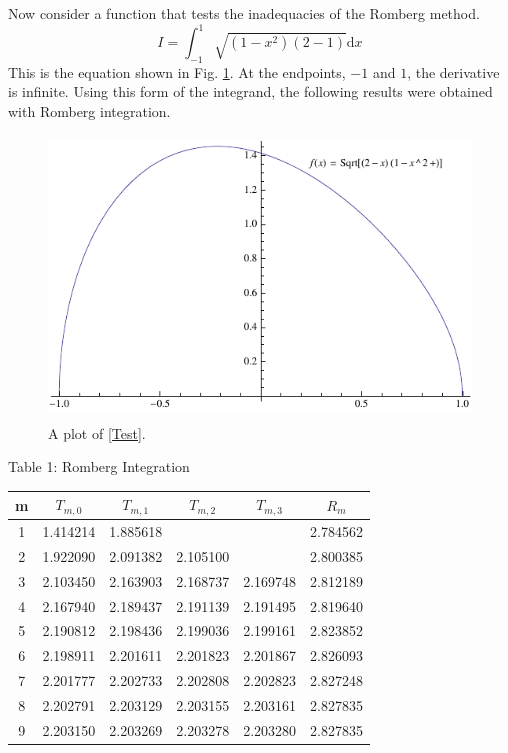 \documentclass[12pt]{article}
\begin{document}
Now consider a function that tests the inadequacies of the Romberg method.
\begin{equation}
\label{Test}
I = \int_{-1}^1 \sqrt{(1-x^2)(2-1)} \mathrm{d}x
\end{equation}
This is the equation shown in Fig. \ref{fig:45}.  At the endpoints, $-1$ and $1$, the derivative is infinite.  Using this form of the integrand, the following results were obtained with Romberg integration.
\begin{figure}[!h]
\centering
\includegraphics[width =120 mm, height = 75mm]{Ex_4_5.pdf}
\caption{A plot of \eqref{Test}.}
\label{fig:45}
\end{figure}
\begin{center}
Table 1:  Romberg Integration \\
\begin{tabular}{ | c | c | c | c | c | c |}
\hline
m& $T_{m,0}$ & $T_{m,1}$ & $T_{m,2}$ & $T_{m,3}$ & $R_m$ \\ \hline
1&	1.414214&	1.885618&	&	&	2.784562\\ \hline
2&	1.922090&	2.091382&	2.105100&	&	2.800385\\ \hline
3&	2.103450&	2.163903&	2.168737&	2.169748&	2.812189\\ \hline
4&	2.167940&	2.189437&	2.191139&	2.191495&	2.819640\\ \hline
5&	2.190812&	2.198436&	2.199036&	2.199161&	2.823852\\ \hline
6&	2.198911&	2.201611&	2.201823&	2.201867&	2.826093\\ \hline
7&	2.201777&	2.202733&	2.202808&	2.202823&	2.827248\\ \hline
8&	2.202791&	2.203129&	2.203155&	2.203161&	2.827835\\ \hline
9&	2.203150&	2.203269&	2.203278&	2.203280&	2.827835\\ \hline
\end{tabular}
\end{center}
\end{document}
